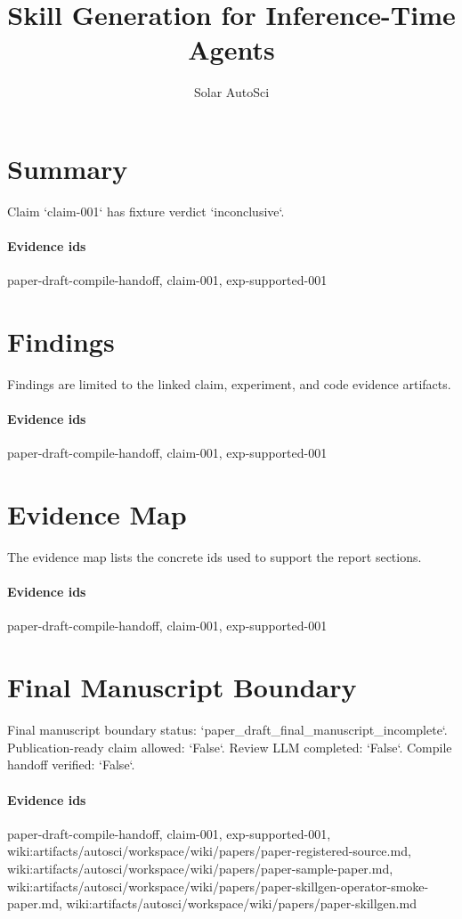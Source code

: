 \documentclass{article}
\title{Skill Generation for Inference-Time Agents}
\author{Solar AutoSci}
\date{}
\begin{document}
\maketitle

\section{Summary}
Claim `claim-001` has fixture verdict `inconclusive`.

\paragraph{Evidence ids} paper-draft-compile-handoff, claim-001, exp-supported-001

\section{Findings}
Findings are limited to the linked claim, experiment, and code evidence artifacts.

\paragraph{Evidence ids} paper-draft-compile-handoff, claim-001, exp-supported-001

\section{Evidence Map}
The evidence map lists the concrete ids used to support the report sections.

\paragraph{Evidence ids} paper-draft-compile-handoff, claim-001, exp-supported-001

\section{Final Manuscript Boundary}
Final manuscript boundary status: `paper\_draft\_final\_manuscript\_incomplete`. Publication-ready claim allowed: `False`. Review LLM completed: `False`. Compile handoff verified: `False`.

\paragraph{Evidence ids} paper-draft-compile-handoff, claim-001, exp-supported-001, wiki:artifacts/autosci/workspace/wiki/papers/paper-registered-source.md, wiki:artifacts/autosci/workspace/wiki/papers/paper-sample-paper.md, wiki:artifacts/autosci/workspace/wiki/papers/paper-skillgen-operator-smoke-paper.md, wiki:artifacts/autosci/workspace/wiki/papers/paper-skillgen.md
\end{document}
